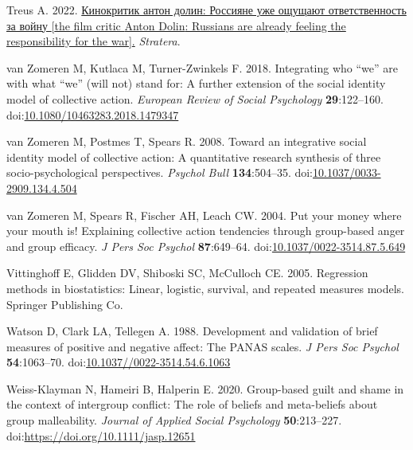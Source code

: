 \documentclass[
]{article}
\newlength{\cslhangindent}
\newenvironment{CSLReferences}[2] %
 {\begin{list}{}{%
  \setlength{\itemindent}{0pt}
  \setlength{\leftmargin}{0pt}
  \setlength{\parsep}{0pt}
  \ifodd #1
   \setlength{\leftmargin}{\cslhangindent}
   \setlength{\itemindent}{-1\cslhangindent}
  \fi
  \setlength{\itemsep}{#2\baselineskip}}}
 {\end{list}}
\begin{document}
\begin{CSLReferences}{1}{0}
Treus A. 2022. \href{https://aussiedlerbote.de/2022/11/kinokritik-anton-dolin-rossiyane-uzhe-oshhushhayut-otvetstvennost-za-vojnu/}{Кинокритик антон долин: Россияне уже ощущают ответственность за войну {[}the film critic {Anton Dolin}: Russians are already feeling the responsibility for the war{]}.} \emph{Stratera}.

van Zomeren M, Kutlaca M, Turner-Zwinkels F. 2018. Integrating who {``}we{''} are with what {``}we{''} (will not) stand for: A further extension of the social identity model of collective action. \emph{European Review of Social Psychology} \textbf{29}:122--160. doi:\href{https://doi.org/10.1080/10463283.2018.1479347}{10.1080/10463283.2018.1479347}

van Zomeren M, Postmes T, Spears R. 2008. Toward an integrative social identity model of collective action: A quantitative research synthesis of three socio-psychological perspectives. \emph{Psychol Bull} \textbf{134}:504--35. doi:\href{https://doi.org/10.1037/0033-2909.134.4.504}{10.1037/0033-2909.134.4.504}

van Zomeren M, Spears R, Fischer AH, Leach CW. 2004. Put your money where your mouth is! Explaining collective action tendencies through group-based anger and group efficacy. \emph{J Pers Soc Psychol} \textbf{87}:649--64. doi:\href{https://doi.org/10.1037/0022-3514.87.5.649}{10.1037/0022-3514.87.5.649}

Vittinghoff E, Glidden DV, Shiboski SC, McCulloch CE. 2005. Regression methods in biostatistics: Linear, logistic, survival, and repeated measures models. Springer Publishing Co.

Watson D, Clark LA, Tellegen A. 1988. Development and validation of brief measures of positive and negative affect: The PANAS scales. \emph{J Pers Soc Psychol} \textbf{54}:1063--70. doi:\href{https://doi.org/10.1037//0022-3514.54.6.1063}{10.1037//0022-3514.54.6.1063}

Weiss-Klayman N, Hameiri B, Halperin E. 2020. Group-based guilt and shame in the context of intergroup conflict: The role of beliefs and meta-beliefs about group malleability. \emph{Journal of Applied Social Psychology} \textbf{50}:213--227. doi:\url{https://doi.org/10.1111/jasp.12651}

\end{CSLReferences}
\end{document}

